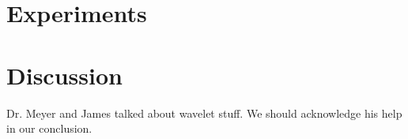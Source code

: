 \documentclass[12pt]{article}
\begin{document}
\section{Experiments}


\section{Discussion}


Dr. Meyer and James talked about wavelet stuff.  We should acknowledge his help in our conclusion.



\end{document}
